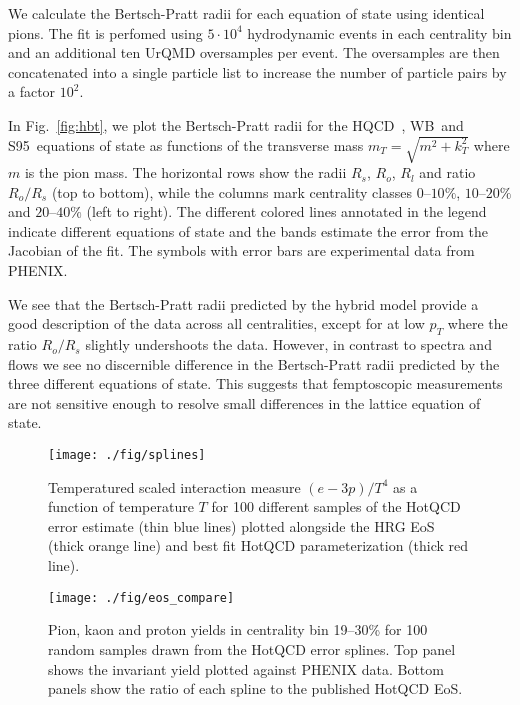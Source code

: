 \documentclass[aps,prc,reprint,amsmath,nofootinbib,superscriptaddress]{revtex4-1}
\newcommand{\hotqcd}{HQCD~}
\newcommand{\wb}{WB~}
\newcommand{\spv}{S95~}
\begin{document}
We calculate the Bertsch-Pratt radii for each equation of state using identical pions. The fit is perfomed using $5\cdot10^4$ hydrodynamic events in each centrality bin and an additional ten UrQMD oversamples per event. The oversamples are then concatenated into a single particle list to increase the number of particle pairs by a factor $10^2$.

In Fig.~\ref{fig:hbt}, we plot the Bertsch-Pratt radii for the \hotqcd, \wb and \spv equations of state as functions of the transverse mass $m_T = \sqrt{m^2 + k_T^2}$ where $m$ is the pion mass. The horizontal rows show the radii $R_s$, $R_o$, $R_l$ and ratio $R_o/R_s$ (top to bottom), while the columns mark centrality classes $0$--$10\%$, $10$--$20\%$ and $20$--$40\%$ (left to right). The different colored lines annotated in the legend indicate different equations of state and the bands estimate the error from the Jacobian 
of the fit. The symbols with error bars are experimental data from PHENIX.

We see that the Bertsch-Pratt radii predicted by the hybrid model provide a good description of the data across all centralities, except for at low $p_T$ where the ratio $R_o/R_s$ slightly undershoots the data. However, in contrast to spectra and flows we see no discernible difference in the Bertsch-Pratt radii predicted by the three different equations of state. This suggests that femptoscopic measurements are not sensitive enough to resolve small differences in the lattice equation of state.

\begin{figure}[t]
  \texttt{[image: ./fig/splines]}
  \caption{
    \label{fig:splines}
    Temperatured scaled interaction measure $(e-3 p)/T^4$ as a function of temperature $T$ for 100 different samples of the HotQCD error estimate (thin blue lines) plotted alongside the HRG EoS (thick orange line) and best fit HotQCD parameterization (thick red line).
  }
\end{figure}

\begin{figure}[t]
  \texttt{[image: ./fig/eos\_compare]}
  \caption{
    \label{fig:splines}
    Pion, kaon and proton yields in centrality bin 19--30\% for 100 random samples drawn from the HotQCD error splines. Top panel shows the invariant yield plotted against PHENIX data. Bottom panels show the ratio of each spline
    to the published HotQCD EoS.
  }
\end{figure}
\end{document}
